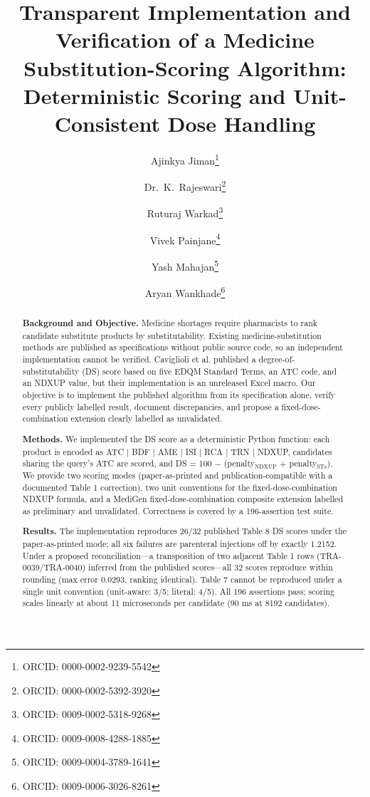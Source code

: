 \documentclass[12pt,twocolumn,a4paper]{elsarticle}
\begin{document}
\onecolumn

\begin{frontmatter}

\title{Transparent Implementation and Verification of a Medicine Substitution-Scoring Algorithm:\\Deterministic Scoring and Unit-Consistent Dose Handling}

\author[1]{Ajinkya Jiman\footnote{ORCID: 0000-0002-9239-5542}}
\author[1]{Dr.~K.~Rajeswari\footnote{ORCID: 0000-0002-5392-3920}}
\author[1]{Ruturaj Warkad\footnote{ORCID: 0009-0002-5318-9268}}
\author[1]{Vivek Painjane\footnote{ORCID: 0009-0008-4288-1885}}
\author[1]{Yash Mahajan\footnote{ORCID: 0009-0004-3789-1641}}
\author[1]{Aryan Wankhade\footnote{ORCID: 0009-0006-3026-8261}}



\begin{abstract}
\textbf{Background and Objective.} Medicine shortages require pharmacists to rank candidate substitute products by substitutability. Existing medicine-substitution methods are published as specifications without public source code, so an independent implementation cannot be verified. Caviglioli et al. published a degree-of-substitutability (DS) score based on five EDQM Standard Terms, an ATC code, and an NDXUP value, but their implementation is an unreleased Excel macro. Our objective is to implement the published algorithm from its specification alone, verify every publicly labelled result, document discrepancies, and propose a fixed-dose-combination extension clearly labelled as unvalidated.

\textbf{Methods.} We implemented the DS score as a deterministic Python function: each product is encoded as ATC | BDF | AME | ISI | RCA | TRN | NDXUP, candidates sharing the query's ATC are scored, and DS = 100 − (penalty$_\text{NDXUP}$ + penalty$_\text{STs}$). We provide two scoring modes (paper-as-printed and publication-compatible with a documented Table 1 correction), two unit conventions for the fixed-dose-combination NDXUP formula, and a MediGen fixed-dose-combination composite extension labelled as preliminary and unvalidated. Correctness is covered by a 196-assertion test suite.

\textbf{Results.} The implementation reproduces 26/32 published Table 8 DS scores under the paper-as-printed mode; all six failures are parenteral injections off by exactly 1.2152. Under a proposed reconciliation---a transposition of two adjacent Table 1 rows (TRA-0039/TRA-0040) inferred from the published scores---all 32 scores reproduce within rounding (max error 0.0293, ranking identical). Table 7 cannot be reproduced under a single unit convention (unit-aware: 3/5; literal: 4/5). All 196 assertions pass; scoring scales linearly at about 11 microseconds per candidate (90 ms at 8192 candidates).


\end{abstract}
\end{frontmatter}
\end{document}
